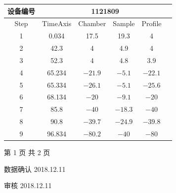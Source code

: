 \documentclass[UTF8,10pt,a4paper,fontset=fandol]{ctexart}
\newcommand{\handwritten}[1]{#1}
\begin{document}
\begin{center}
\small
\begin{tabular}{|c|c|c|c|c|c|}
\hline
\multicolumn{1}{|c|}{设备编号} & \multicolumn{5}{c|}{1121809} \\
\hline
Step & TimeAxis & Chamber & Sample & Profile \\
\hline
1 & 0.034 & 17.5 & 19.3 & 4 \\
\hline
2 & 42.3 & 4 & 4.9 & 4 \\
\hline
3 & 52.3 & 4 & 4.8 & 3.9 \\
\hline
4 & 65.234 & $-21.9$ & $-5.1$ & $-22.1$ \\
\hline
5 & 65.334 & $-26.1$ & $-5.1$ & $-25.6$ \\
\hline
6 & 68.134 & $-20$ & $-9.1$ & $-20$ \\
\hline
7 & 85.8 & $-40$ & $-18.3$ & $-40$ \\
\hline
8 & 90.8 & $-39.7$ & $-24.9$ & $-39.8$ \\
\hline
9 & 96.834 & $-80.2$ & $-40$ & $-80$ \\
\hline
\end{tabular}
\end{center}

\begin{center}
第 1 页 共 2 页
\end{center}

\handwritten{数据确认 2018.12.11}

\handwritten{审核 2018.12.11}

\newpage
\end{document}
